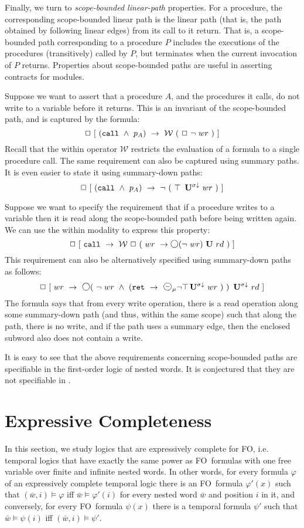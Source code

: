 \documentclass{LMCS}
\newcommand{\M}{{\mu}}
\newcommand{\w}{{\bar{w}}}
\newcommand{\dm}{\Diamond}
\newcommand{\WW}{{\mathcal{W}}}
\newcommand{\U}{{\mathbf U}}
\newcommand{\next}{\text{\raisebox{1pt}{$\bigcirc$}}}
\newcommand{\FO}{{\rm FO}}
\renewcommand{\phi}{\varphi}
\theoremstyle{plain}
\theoremstyle{definition}
\newcommand{\ppath}{\sigma} \newcommand{\Ul}{\U}
\newcommand{\always}{\Box}
\newcommand{\prev}{{\text{\Large $\mathbf{\circleddash}$}}}
\newcommand{\until}{\U}
\newcommand{\caret}{\text{CaRet}}
\newcommand{\retr}{\mathit{ret}}
\newcommand{\dpuntil}{{\,\U^{\ppath\downarrow}}}
\newcommand{\rett}{{\tt ret}}
\newcommand{\call}{{\tt call}}
\renewcommand{\retr}{\rett}
\newcommand{\dmminus}{\dm^-}
\newcommand{\dmmminus}{\dm_{\M}^-}
\renewcommand{\dm}{\next}
\renewcommand{\dmminus}{\prev}
\renewcommand{\dmmminus}{\dmminus_{\M}}
\begin{document}
Finally, we turn to {\em scope-bounded linear-path\/} properties.  For
a procedure, the corresponding scope-bounded linear path is the linear
path (that is, the path obtained by following linear edges) from its
call to it return.  That is, a scope-bounded path corresponding to a
procedure $P$ includes the executions of the procedures (transitively)
called by $P$, but terminates when the current invocation of $P$
returns.  Properties about scope-bounded paths are useful in asserting
contracts for modules.

Suppose we want to assert that a procedure $A$, and the procedures it
calls, do not write to a variable before it returns.  This is an
invariant of the scope-bounded path, and is captured by the formula:
\[\always\ [\ (\call\ \wedge\ p_A)\ \rightarrow\ \WW\ (\ \always\
\neg\ wr\ )\ ] \] 
Recall that the within operator $\WW$ restricts the evaluation of a
formula to a single procedure call. 
The same requirement can also be captured using summary
paths. It is even easier to state it using summary-down paths:
  \[\always\ [\ (\call\ \wedge\ p_A)\ \rightarrow\ \neg\ (\ \top\
\dpuntil\ wr\ )\ ]\]

Suppose we want to specify the requirement that if a procedure writes
to a variable then it is read along the scope-bounded path before
being written again.  We can use the within modality to express this
property: \[ \always\ [\ \call\ \rightarrow \ \WW\ \always\ (\ wr\
\rightarrow \dm (\neg\ wr)\ \until\ rd\ )\ ]\] This requirement can also
be alternatively specified using summary-down paths as follows:
\[\always\ [\ wr\ \rightarrow\ \dm (\ \neg\ wr\ \wedge\ (\retr\
\rightarrow\ \dmmminus\neg \top \dpuntil\ wr\ )\ )\ \dpuntil\ rd\ ]\]
The formula says that from every write operation, there is a read
operation along some summary-down path (and thus, within the same
scope) such that along the path, there is no write, and if the path
uses a summary edge, then the enclosed subword also does not contain a
write.


It is easy to see that the above requirements 
concerning scope-bounded paths are specifiable in the first-order
logic of nested words. It is conjectured that they
are not specifiable in \caret{}. 


\section{Expressive Completeness}
\label{expcompl-sec}

\noindent In this section, we study logics that are expressively complete for
\FO, i.e. temporal logics that have exactly the same power as \FO\
formulas with one free variable over finite and infinite nested words.
In other words, for every formula $\phi$ of an expressively complete
temporal logic there is an \FO\ formula $\phi'(x)$ such that
$(\w,i)\models\phi$ iff $\w\models\phi'(i)$ for every nested word $\w$
and position $i$ in it, and conversely, for every \FO\ formula $\psi(x)$ 
there is a temporal formula $\psi'$ such that $\w\models\psi(i)$ iff
$(\w,i)\models\psi'$. 
\end{document}
